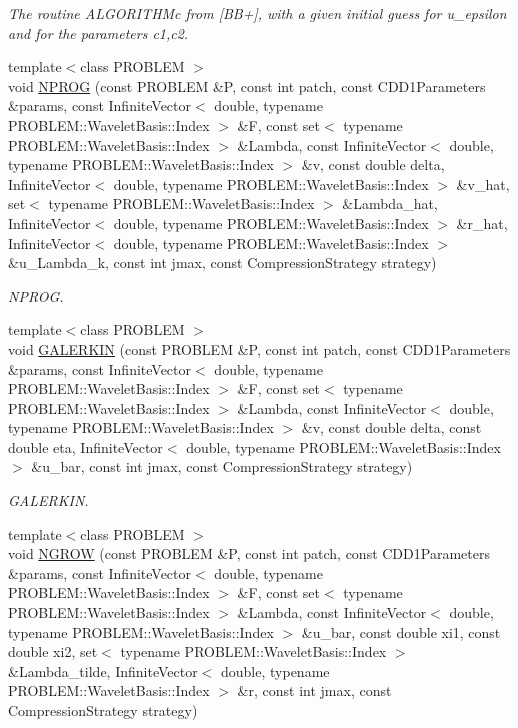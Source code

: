 \begin{CompactItemize}
\begin{CompactList}\small\item\em The routine ALGORITHMc from \mbox{[}BB+\mbox{]}, with a given initial guess for u\_\-epsilon and for the parameters c1,c2. \item\end{CompactList}\item 
{\footnotesize template$<$class PROBLEM $>$ }\\void \hyperlink{namespaceFrameTL_d25b2eb9873b17224cdc0ddc9b0d04b1}{NPROG} (const PROBLEM \&P, const int patch, const CDD1Parameters \&params, const InfiniteVector$<$ double, typename PROBLEM::WaveletBasis::Index $>$ \&F, const set$<$ typename PROBLEM::WaveletBasis::Index $>$ \&Lambda, const InfiniteVector$<$ double, typename PROBLEM::WaveletBasis::Index $>$ \&v, const double delta, InfiniteVector$<$ double, typename PROBLEM::WaveletBasis::Index $>$ \&v\_\-hat, set$<$ typename PROBLEM::WaveletBasis::Index $>$ \&Lambda\_\-hat, InfiniteVector$<$ double, typename PROBLEM::WaveletBasis::Index $>$ \&r\_\-hat, InfiniteVector$<$ double, typename PROBLEM::WaveletBasis::Index $>$ \&u\_\-Lambda\_\-k, const int jmax, const CompressionStrategy strategy)
\begin{CompactList}\small\item\em NPROG. \item\end{CompactList}\item 
{\footnotesize template$<$class PROBLEM $>$ }\\void \hyperlink{namespaceFrameTL_5338ae7f2ce93a8449560cc020fa212a}{GALERKIN} (const PROBLEM \&P, const int patch, const CDD1Parameters \&params, const InfiniteVector$<$ double, typename PROBLEM::WaveletBasis::Index $>$ \&F, const set$<$ typename PROBLEM::WaveletBasis::Index $>$ \&Lambda, const InfiniteVector$<$ double, typename PROBLEM::WaveletBasis::Index $>$ \&v, const double delta, const double eta, InfiniteVector$<$ double, typename PROBLEM::WaveletBasis::Index $>$ \&u\_\-bar, const int jmax, const CompressionStrategy strategy)
\begin{CompactList}\small\item\em GALERKIN. \item\end{CompactList}\item 
{\footnotesize template$<$class PROBLEM $>$ }\\void \hyperlink{namespaceFrameTL_f3d9112d64f468a664317686725617bd}{NGROW} (const PROBLEM \&P, const int patch, const CDD1Parameters \&params, const InfiniteVector$<$ double, typename PROBLEM::WaveletBasis::Index $>$ \&F, const set$<$ typename PROBLEM::WaveletBasis::Index $>$ \&Lambda, const InfiniteVector$<$ double, typename PROBLEM::WaveletBasis::Index $>$ \&u\_\-bar, const double xi1, const double xi2, set$<$ typename PROBLEM::WaveletBasis::Index $>$ \&Lambda\_\-tilde, InfiniteVector$<$ double, typename PROBLEM::WaveletBasis::Index $>$ \&r, const int jmax, const CompressionStrategy strategy)

\end{CompactItemize}

